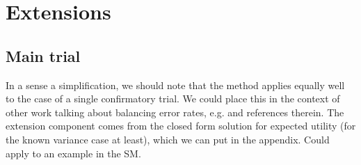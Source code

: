 \documentclass[sagev, Crown]{sagej} %
\begin{document}




\section{Extensions}\label{sec:extensions}

\subsection{Main trial}

In a sense a simplification, we should note that the method applies equally well to the case of a single confirmatory trial. We could place this in the context of other work talking about balancing error rates, e.g. \cite{Grieve2015, Walley2021} and references therein. The extension component comes from the closed form solution for expected utility (for the known variance case at least), which we can put in the appendix. Could apply to an example in the SM.
\end{document}
